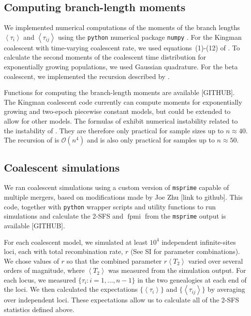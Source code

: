 \documentclass[11pt, letterpaper]{article}   	%
\newcommand{\E}[1]{\left< #1 \right>}
\DeclareMathOperator{\fpmi}{fpmi}
\begin{document}
\subsection*{Computing branch-length moments}

We implemented numerical computations of the moments of the branch lengths $\E{\tau_i}$ and $\E{\tau_{ij}}$ using the \texttt{python} numerical package \texttt{numpy} \autocite{numpy}.
For the Kingman coalescent with time-varying coalescent rate, we used equations~(1)-(12) of \cite{ZivkovicWiehe2008}.
To calculate the second moments of the coalescent time distribution for exponentially growing populations, we used Gaussian quadrature.
For the beta coalescent, we implemented the recursion described by \cite{BirknerEtAl2013}.

Functions for computing the branch-length moments are available [GITHUB].
The Kingman coalescent code currently can compute moments for exponentially growing and two-epoch piecewise constant models, but could be extended to allow for other models.
The formulas of \cite{ZivkovicWiehe2008} exhibit numerical instability related to the instability of \cite{GriffithsTavare1994}.
They are therefore only practical for sample sizes up to $n \approx 40$.
The recursion of \cite{BirknerEtAl2013} is $\mathcal{O}(n^4)$ and is also only practical for samples up to $n \approx 50$.

\subsection*{Coalescent simulations}

We ran coalescent simulations using a custom version of \texttt{msprime} \autocite{KelleherEtAl2014} capable of multiple mergers, based on modifications made by Joe Zhu [link to github].
This code, together with \texttt{python} wrapper scripts and utility functions to run simulations and calculate the 2-SFS and $\fpmi$ from the \texttt{msprime} output is available [GITHUB].

For each coalescent model, we simulated at least $10^4$ independent infinite-sites loci, each with total recombination rate, $r$ (See SI for parameter combinations).
We chose values of $r$ so that the combined parameter $r\E{T_2}$ varied over several orders of magnitude, where $\E{T_2}$ was measured from the simulation output.
For each locus, we measured $\{\tau_i : i = 1,\ldots,n-1\}$ in the two genealogies at each end of the loci.
We then calculated the expectations $\{\E{\tau_i}\}$ and $\{\E{\tau_{ij}}\}$ by averaging over independent loci.
These expectations allow us to calculate all of the 2-SFS statistics defined above.
\end{document}
